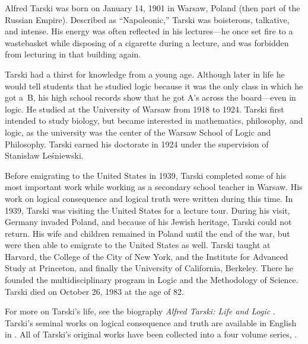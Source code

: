 \documentclass[../../../include/open-logic-section]{subfiles}
\begin{document}


Alfred Tarski was born on January 14, 1901 in Warsaw, Poland (then
part of the Russian Empire). Described as ``Napoleonic,'' Tarski was
boisterous, talkative, and intense.  His energy was often reflected in
his lectures---he once set fire to a wastebasket while disposing of a
cigarette during a lecture, and was forbidden from lecturing in that
building again.

Tarski had a thirst for knowledge from a young age. Although later in
life he would tell students that he studied logic because it was the
only class in which he got a~B, his high school records show that he
got A's across the board---even in logic. He studied at the University
of Warsaw from 1918 to 1924. Tarski first intended to study
biology, but became interested in mathematics, philosophy, and logic,
as the university was the center of the Warsaw School of Logic and
Philosophy. Tarski earned his doctorate in 1924 under the supervision of
Stanis\l{}aw Le\'{s}niewski.

Before emigrating to the United States in 1939, Tarski completed some
of his most important work while working as a secondary school teacher
in Warsaw. His work on logical consequence and logical truth were
written during this time. In 1939, Tarski was visiting the United
States for a lecture tour. During his visit, Germany invaded Poland,
and because of his Jewish heritage, Tarski could not return.  His wife
and children remained in Poland until the end of the war, but were
then able to emigrate to the United States as well.  Tarski taught at
Harvard, the College of the City of New York, and the Institute for
Advanced Study at Princeton, and finally the University of California,
Berkeley. There he founded the multidisciplinary program in Logic and
the Methodology of Science.  Tarski died on October 26, 1983 at the
age of 82.

\begin{reading} 
For more on Tarski's life, see the biography \emph{Alfred Tarski: Life
  and Logic} \cite{Feferman2004}. Tarski's seminal works on logical
consequence and truth are available in English in \cite{Tarski1983}.
All of Tarski's original works have been collected into a four volume
series, \cite{Tarski1981}.
\end{reading}
\end{document}
